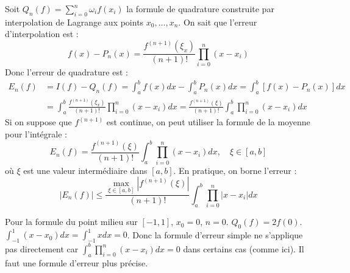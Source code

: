 \documentclass[oneside]{book}
\begin{document}
Soit $Q_n(f) = \sum_{i=0}^{n} \omega_i f(x_i)$ la formule de quadrature construite par interpolation de Lagrange aux points $x_0, \dots, x_n$.
On sait que l'erreur d'interpolation est :
\[
f(x) - P_n(x) = \frac{f^{(n+1)}(\xi_x)}{(n+1)!} \prod_{i=0}^{n} (x - x_i)
\]
Donc l'erreur de quadrature est :
\begin{align*}
E_n(f) &= I(f) - Q_n(f) = \int_{a}^{b} f(x) dx - \int_{a}^{b} P_n(x) dx = \int_{a}^{b} [f(x) - P_n(x)] dx \\
&= \int_{a}^{b} \frac{f^{(n+1)}(\xi_x)}{(n+1)!} \prod_{i=0}^{n} (x - x_i) dx = \frac{f^{(n+1)}(\xi)}{(n+1)!} \int_{a}^{b} \prod_{i=0}^{n} (x - x_i) dx
\end{align*}
Si on suppose que $f^{(n+1)}$ est continue, on peut utiliser la formule de la moyenne pour l'intégrale :
\[
E_n(f) = \frac{f^{(n+1)}(\xi)}{(n+1)!} \int_{a}^{b} \prod_{i=0}^{n} (x - x_i) dx, \quad \xi \in [a, b]
\]
où $\xi$ est une valeur intermédiaire dans $[a, b]$. En pratique, on borne l'erreur :
\[
|E_n(f)| \leq \frac{\max_{\xi \in [a, b]} |f^{(n+1)}(\xi)|}{(n+1)!} \int_{a}^{b} \prod_{i=0}^{n} |x - x_i| dx
\]

\begin{remark}
Pour la formule du point milieu sur $[-1, 1]$, $x_0 = 0$, $n = 0$.
$Q_0(f) = 2f(0)$. $\int_{-1}^{1} (x - x_0) dx = \int_{-1}^{1} x dx = 0$.
Donc la formule d'erreur simple ne s'applique pas directement car $\int_{a}^{b} \prod_{i=0}^{n} (x - x_i) dx = 0$ dans certains cas (comme ici).
Il faut une formule d'erreur plus précise.
\end{remark}
\end{document}

